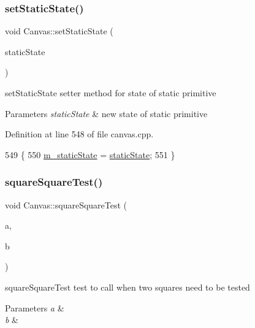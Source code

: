 \subsubsection{\texorpdfstring{set\+Static\+State()}{setStaticState()}}
{\footnotesize\ttfamily void Canvas\+::set\+Static\+State (\begin{DoxyParamCaption}\item[{int}]{static\+State }\end{DoxyParamCaption})}



set\+Static\+State setter method for state of static primitive 


\begin{DoxyParams}{Parameters}
{\em static\+State} & new state of static primitive \\
\hline
\end{DoxyParams}


Definition at line 548 of file canvas.\+cpp.


\begin{DoxyCode}
549 \{
550     \hyperlink{class_canvas_adb29cf13087e13c9d4a1ef04bc53b931}{m\_staticState} = \hyperlink{class_canvas_a63f657b762d08168f52630bc49efbf71}{staticState};
551 \}
\end{DoxyCode}
\mbox{\label{class_canvas_a56718ad140b37cabc6b34157903886ee}} 
\subsubsection{\texorpdfstring{square\+Square\+Test()}{squareSquareTest()}}
{\footnotesize\ttfamily void Canvas\+::square\+Square\+Test (\begin{DoxyParamCaption}\item[{\hyperlink{class_a_a_b_b}{A\+A\+BB}}]{a,  }\item[{\hyperlink{class_a_a_b_b}{A\+A\+BB}}]{b }\end{DoxyParamCaption})\hspace{0.3cm}{\ttfamily [private]}}



square\+Square\+Test test to call when two squares need to be tested 


\begin{DoxyParams}{Parameters}
{\em a} & \\
\hline
{\em b} & \\
\hline
\end{DoxyParams}


